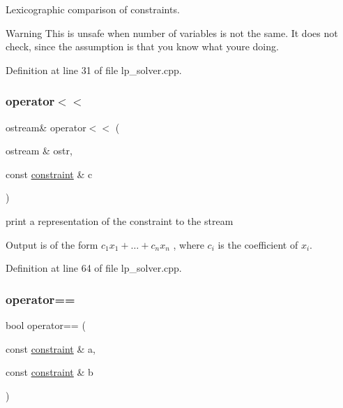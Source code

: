Lexicographic comparison of constraints. 

\begin{DoxyWarning}{Warning}
This is unsafe when number of variables is not the same. It does not check, since the assumption is that you know what you\textquotesingle{}re doing. 
\end{DoxyWarning}


Definition at line 31 of file lp\+\_\+solver.\+cpp.

\mbox{\label{classconstraint_a829b1dbba361c34d021ebe82ccf5cb7f}} 
\subsubsection{\texorpdfstring{operator$<$$<$}{operator<<}}
{\footnotesize\ttfamily ostream\& operator$<$$<$ (\begin{DoxyParamCaption}\item[{ostream \&}]{ostr,  }\item[{const \hyperlink{classconstraint}{constraint} \&}]{c }\end{DoxyParamCaption})\hspace{0.3cm}{\ttfamily [friend]}}



print a representation of the constraint to the stream 

Output is of the form $ c_1 x_1 + \ldots + c_n x_n $ , where $ c_i $ is the coefficient of $ x_i $. 

Definition at line 64 of file lp\+\_\+solver.\+cpp.

\mbox{\label{classconstraint_acb6f7858d12f0c03f1c8be86ecbef902}} 
\subsubsection{\texorpdfstring{operator==}{operator==}}
{\footnotesize\ttfamily bool operator== (\begin{DoxyParamCaption}\item[{const \hyperlink{classconstraint}{constraint} \&}]{a,  }\item[{const \hyperlink{classconstraint}{constraint} \&}]{b }\end{DoxyParamCaption})\hspace{0.3cm}{\ttfamily [friend]}}



